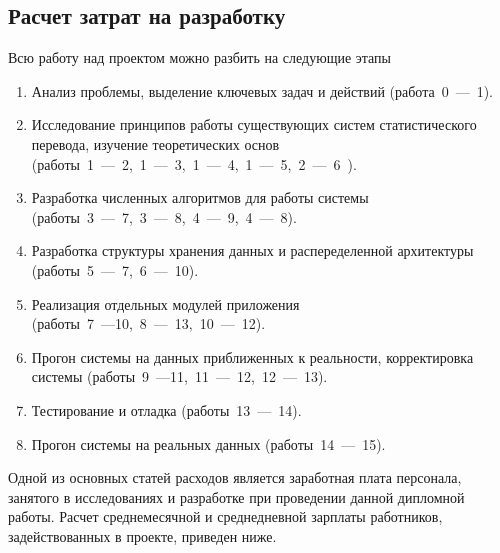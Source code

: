 
\subsection{Расчет затрат на разработку}

Всю работу над проектом можно разбить на следующие этапы
\begin{enumerate}
	\item  Анализ проблемы, выделение ключевых задач и действий 
		\mbox{(работа 0 --- 1)}.
	\item  Исследование принципов работы существующих систем статистического перевода, 
		изучение теоретических основ \\ \mbox{(работы 1 --- 2, 1 --- 3, 1 --- 4, 1 --- 5, 2 --- 6 )}.
	\item  Разработка  численных алгоритмов для работы системы \\ \mbox{(работы 3 --- 7, 3 --- 8, 4 --- 9, 4 --- 8)}.
	\item  Разработка структуры хранения данных и распеределенной архитектуры \\ \mbox{(работы 5 --- 7, 6 --- 10)}.
	\item  Реализация отдельных модулей приложения \\ \mbox{(работы 7 ---10, 8 --- 13, 10 --- 12)}.
	\item  Прогон системы на данных приближенных к реальности, корректировка системы \mbox{(работы 9 ---11, 11 --- 12, 12 --- 13)}.
	\item  Тестирование и отладка \mbox{(работы 13 --- 14)}.
	\item  Прогон системы на реальных данных \mbox{(работы 14 --- 15)}.
\end{enumerate}

Одной из основных статей расходов является заработная плата персонала, 
занятого в исследованиях и разработке при проведении данной дипломной работы. 
Расчет среднемесячной и среднедневной зарплаты работников,\\
задействованных в проекте, приведен ниже.


